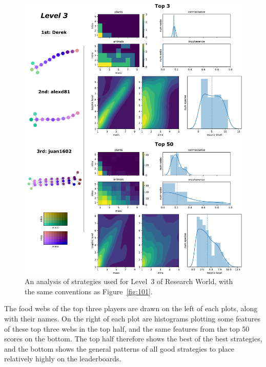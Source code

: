 \begin{figure}
  \centering
  \includegraphics[height=.85\textheight, right]{joy/103.pdf}
  \caption[Results from Research World Level~3]{An analysis of strategies used for Level~3 of Research World, with the same conventions as Figure~\ref{fig:101}.}
  \label{fig:103}
\end{figure}
The food webs of the top three players are drawn on the left of each plots, along with their names. On the right of each plot are histograms plotting some features of these top three webs in the top half, and the same features from the top 50 scores on the bottom. The top half therefore shows the best of the best strategies, and the bottom shows the general patterns of all good strategies to place relatively highly on the leaderboards.

